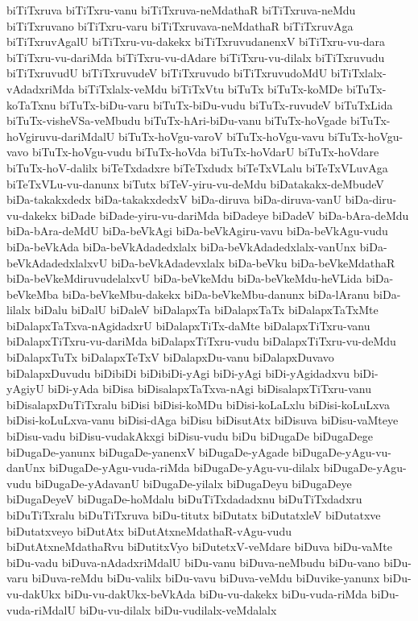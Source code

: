 {biTiTxruva
biTiTxru-vanu
biTiTxruva-neMdathaR
biTiTxruva-neMdu
biTiTxruvano
biTiTxru-varu
biTiTxruvava-neMdathaR
biTiTxruvAga
biTiTxruvAgalU
biTiTxru-vu-dakekx
biTiTxruvudanenxV
biTiTxru-vu-dara
biTiTxru-vu-dariMda
biTiTxru-vu-dAdare
biTiTxru-vu-dilalx
biTiTxruvudu
biTiTxruvudU
biTiTxruvudeV
biTiTxruvudo
biTiTxruvudoMdU
biTiTxlalx-vAdadxriMda
biTiTxlalx-veMdu
biTiTxVtu
biTuTx
biTuTx-koMDe
biTuTx-koTaTxnu
biTuTx-biDu-varu
biTuTx-biDu-vudu
biTuTx-ruvudeV
biTuTxLida
biTuTx-visheVSa-veMbudu
biTuTx-hAri-biDu-vanu
biTuTx-hoVgade
biTuTx-hoVgiruvu-dariMdalU
biTuTx-hoVgu-varoV
biTuTx-hoVgu-vavu
biTuTx-hoVgu-vavo
biTuTx-hoVgu-vudu
biTuTx-hoVda
biTuTx-hoVdarU
biTuTx-hoVdare
biTuTx-hoV-dalilx
biTeTxdadxre
biTeTxdudx
biTeTxVLalu
biTeTxVLuvAga
biTeTxVLu-vu-danunx
biTutx
biTeV-yiru-vu-deMdu
biDatakakx-deMbudeV
biDa-takakxdedx
biDa-takakxdedxV
biDa-diruva
biDa-diruva-vanU
biDa-diru-vu-dakekx
biDade
biDade-yiru-vu-dariMda
biDadeye
biDadeV
biDa-bAra-deMdu
biDa-bAra-deMdU
biDa-beVkAgi
biDa-beVkAgiru-vavu
biDa-beVkAgu-vudu
biDa-beVkAda
biDa-beVkAdadedxlalx
biDa-beVkAdadedxlalx-vanUnx
biDa-beVkAdadedxlalxvU
biDa-beVkAdadevxlalx
biDa-beVku
biDa-beVkeMdathaR
biDa-beVkeMdiruvudelalxvU
biDa-beVkeMdu
biDa-beVkeMdu-heVLida
biDa-beVkeMba
biDa-beVkeMbu-dakekx
biDa-beVkeMbu-danunx
biDa-lAranu
biDa-lilalx
biDalu
biDalU
biDaleV
biDalapxTa
biDalapxTaTx
biDalapxTaTxMte
biDalapxTaTxva-nAgidadxrU
biDalapxTiTx-daMte
biDalapxTiTxru-vanu
biDalapxTiTxru-vu-dariMda
biDalapxTiTxru-vudu
biDalapxTiTxru-vu-deMdu
biDalapxTuTx
biDalapxTeTxV
biDalapxDu-vanu
biDalapxDuvavo
biDalapxDuvudu
biDibiDi
biDibiDi-yAgi
biDi-yAgi
biDi-yAgidadxvu
biDi-yAgiyU
biDi-yAda
biDisa
biDisalapxTaTxva-nAgi
biDisalapxTiTxru-vanu
biDisalapxDuTiTxralu
biDisi
biDisi-koMDu
biDisi-koLaLxlu
biDisi-koLuLxva
biDisi-koLuLxva-vanu
biDisi-dAga
biDisu
biDisutAtx
biDisuva
biDisu-vaMteye
biDisu-vadu
biDisu-vudakAkxgi
biDisu-vudu
biDu
biDugaDe
biDugaDege
biDugaDe-yanunx
biDugaDe-yanenxV
biDugaDe-yAgade
biDugaDe-yAgu-vu-danUnx
biDugaDe-yAgu-vuda-riMda
biDugaDe-yAgu-vu-dilalx
biDugaDe-yAgu-vudu
biDugaDe-yAdavanU
biDugaDe-yilalx
biDugaDeyu
biDugaDeye
biDugaDeyeV
biDugaDe-hoMdalu
biDuTiTxdadadxnu
biDuTiTxdadxru
biDuTiTxralu
biDuTiTxruva
biDu-titutx
biDutatx
biDutatxleV
biDutatxve
biDutatxveyo
biDutAtx
biDutAtxneMdathaR-vAgu-vudu
biDutAtxneMdathaRvu
biDutitxVyo
biDutetxV-veMdare
biDuva
biDu-vaMte
biDu-vadu
biDuva-nAdadxriMdalU
biDu-vanu
biDuva-neMbudu
biDu-vano
biDu-varu
biDuva-reMdu
biDu-valilx
biDu-vavu
biDuva-veMdu
biDuvike-yanunx
biDu-vu-dakUkx
biDu-vu-dakUkx-beVkAda
biDu-vu-dakekx
biDu-vuda-riMda
biDu-vuda-riMdalU
biDu-vu-dilalx
biDu-vudilalx-veMdalalx
}
